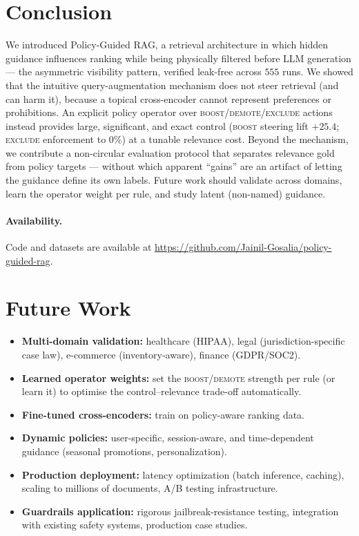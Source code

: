 \documentclass[11pt]{article}
\begin{document}
\section{Conclusion}
We introduced Policy-Guided RAG, a retrieval architecture in which hidden guidance influences
ranking while being physically filtered before LLM generation --- the asymmetric visibility
pattern, verified leak-free across $555$ runs. We showed that the intuitive query-augmentation
mechanism does not steer retrieval (and can harm it), because a topical cross-encoder cannot
represent preferences or prohibitions. An explicit policy operator over
\textsc{boost}/\textsc{demote}/\textsc{exclude} actions instead provides large, significant,
and exact control (\textsc{boost} steering lift $+25.4$; \textsc{exclude} enforcement to $0\%$)
at a tunable relevance cost. Beyond the mechanism, we contribute a non-circular evaluation
protocol that separates relevance gold from policy targets --- without which apparent ``gains''
are an artifact of letting the guidance define its own labels. Future work should validate
across domains, learn the operator weight per rule, and study latent (non-named) guidance.

\paragraph{Availability.} Code and datasets are available at
\url{https://github.com/Jainil-Gosalia/policy-guided-rag}.

\section{Future Work}
\begin{itemize}[leftmargin=1.4em,itemsep=1pt]
  \item \textbf{Multi-domain validation:} healthcare (HIPAA), legal (jurisdiction-specific
  case law), e-commerce (inventory-aware), finance (GDPR/SOC2).
  \item \textbf{Learned operator weights:} set the \textsc{boost}/\textsc{demote} strength
  per rule (or learn it) to optimise the control--relevance trade-off automatically.
  \item \textbf{Fine-tuned cross-encoders:} train on policy-aware ranking data.
  \item \textbf{Dynamic policies:} user-specific, session-aware, and time-dependent guidance
  (seasonal promotions, personalization).
  \item \textbf{Production deployment:} latency optimization (batch inference, caching),
  scaling to millions of documents, A/B testing infrastructure.
  \item \textbf{Guardrails application:} rigorous jailbreak-resistance testing, integration
  with existing safety systems, production case studies.
\end{itemize}

\nocite{*}


\end{document}
